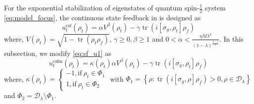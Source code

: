 \documentclass[]{elsarticle}
\begin{document}
For the exponential stabilization of eigenstates of quantum spin-$\frac{1}{2}$ system \eqref{eq:model_focus}, the continuous state feedback in \cite{LAMC2018} is designed as
\begin{equation}\label{eq:sf_u1}
	u_t^{\mathrm{csf}}\left(\rho_{t}\right)=\alpha V^{\beta}\left(\rho_{t}\right)-\gamma \operatorname{tr}\left(i\left[\sigma_{y}, \rho_{t}\right] \rho_f\right)
\end{equation}
where, $V(\rho_{t})=\sqrt{1-\operatorname{tr}\left(\rho_t\rho_f\right)}$, $\gamma \geq 0, \beta \geq 1$ and $0<\alpha<\frac{\eta M \lambda^{2}}{\left(1-\lambda\right)^{\frac{\beta-1}{2}}}$. {}
In this subsection, we modify \eqref{eq:sf_u1} as
\begin{equation}\label{eq:sf_u1_imp}
	u_t^{\mathrm{csfm}}\left(\rho_{t}\right)=\kappa\left(\rho_{t}\right)\alpha V^{\beta}\left(\rho_{t}\right)-\gamma \operatorname{tr}\left(i\left[\sigma_{y}, \rho_{t}\right] \rho_f\right)
\end{equation}
where, $\kappa\left(\rho_{t}\right)=\left\{ \begin{array}{l}-1, \text{if}~\rho_t\in\Phi_1\\ 1, \text{if}~ \rho_t\in\Phi_2 \end{array} \right.$ with $\Phi_1=\left\{\rho:\operatorname{tr}\left(i\left[\sigma_{y}, \rho\right] {\rho_f}\right)>0, \rho\in \mathcal{D}_\lambda\right\}$ and $\Phi_2=\mathcal{D}_\lambda\setminus\Phi_1$.
\end{document}

